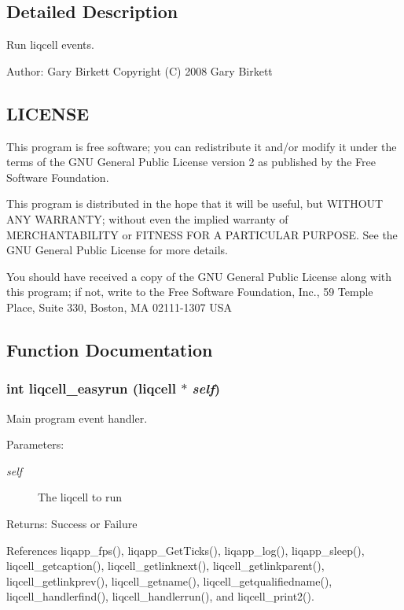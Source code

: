 \label{_details}
\subsection{Detailed Description}
Run liqcell events. 

\begin{Desc}
\item[Author:]Gary Birkett Copyright (C) 2008 Gary Birkett\end{Desc}
\subsection{LICENSE}\label{d7/db4/liqcell__prop_8c_LICENSE}
This program is free software; you can redistribute it and/or modify it under the terms of the GNU General Public License version 2 as published by the Free Software Foundation.

This program is distributed in the hope that it will be useful, but WITHOUT ANY WARRANTY; without even the implied warranty of MERCHANTABILITY or FITNESS FOR A PARTICULAR PURPOSE. See the GNU General Public License for more details.

You should have received a copy of the GNU General Public License along with this program; if not, write to the Free Software Foundation, Inc., 59 Temple Place, Suite 330, Boston, MA 02111-1307 USA 

\subsection{Function Documentation}
\subsubsection[{liqcell\_\-easyrun}]{\setlength{\rightskip}{0pt plus 5cm}int liqcell\_\-easyrun (liqcell $\ast$ {\em self})}\label{d5/d54/liqcell__easyrun_8c_188e60421511aac91bdf91a796c0718f}


Main program event handler. \begin{Desc}
\item[Parameters:]
\begin{description}
\item[{\em self}]The liqcell to run \end{description}
\end{Desc}
\begin{Desc}
\item[Returns:]Success or Failure \end{Desc}


References liqapp\_\-fps(), liqapp\_\-GetTicks(), liqapp\_\-log(), liqapp\_\-sleep(), liqcell\_\-getcaption(), liqcell\_\-getlinknext(), liqcell\_\-getlinkparent(), liqcell\_\-getlinkprev(), liqcell\_\-getname(), liqcell\_\-getqualifiedname(), liqcell\_\-handlerfind(), liqcell\_\-handlerrun(), and liqcell\_\-print2().
